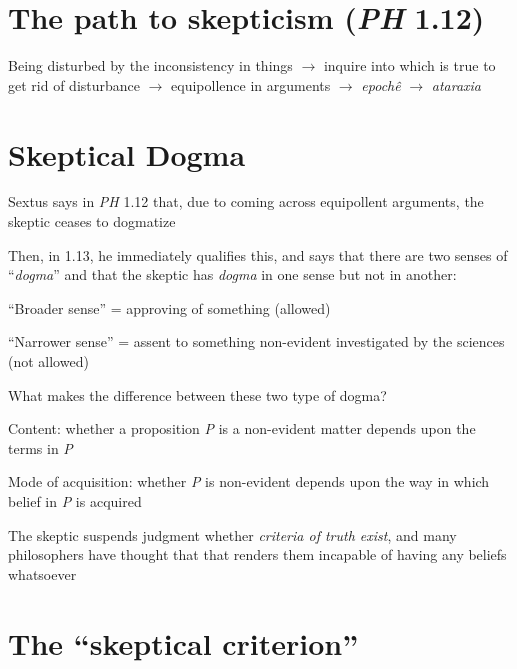 \documentclass[11pt]{article}
\begin{document}
\section*{The path to skepticism (\emph{PH} 1.12)}

\noindent Being disturbed by the inconsistency in things $\rightarrow$ inquire into which is true to get rid of disturbance $\rightarrow$ equipollence in arguments $\rightarrow$ \emph{epoch\^{e}} $\rightarrow$ \emph{ataraxia}

\section*{Skeptical Dogma}

\noindent Sextus says in \emph{PH} 1.12 that, due to coming across equipollent arguments, the skeptic ceases to dogmatize
\vspace*{2mm}

\noindent Then, in 1.13, he immediately qualifies this, and says that there are two senses of ``\emph{dogma}'' and that the skeptic has \emph{dogma} in one sense but not in another:
\vspace*{2mm}

``Broader sense'' = approving of something (allowed)
\vspace*{1mm}

``Narrower sense'' = assent to something non-evident investigated by the sciences (not allowed)
\vspace*{2mm}

\noindent What makes the difference between these two type of dogma?
\vspace*{2mm}

Content: whether a proposition \emph{P} is a non-evident matter depends upon the terms in \emph{P}
\vspace*{1mm}

Mode of acquisition: whether \emph{P} is non-evident depends upon the way in which belief in \emph{P} is acquired
\vspace*{2mm}

\noindent The skeptic suspends judgment whether \emph{criteria of truth exist}, and many philosophers have thought that that renders them incapable of having any beliefs whatsoever

\section*{The ``skeptical criterion''}
\end{document}
